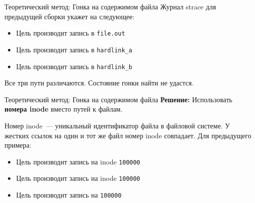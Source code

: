     \begin{frame}{Теоретический метод: Гонка на содержимом файла}
        Журнал strace для предыдущей сборки укажет на следующее:

        \begin{itemize}
            \item Цель  производит запись в \texttt{file.out}
            \item Цель  производит запись в \texttt{hardlink\_a}
            \item Цель  производит запись в \texttt{hardlink\_b}
        \end{itemize}

        Все три пути различаются. Состояние гонки найти не удастся.


    \end{frame}

    \begin{frame}{Теоретический метод: Гонка на содержимом файла}
        \textbf{Решение:} Использовать \textbf{номера inode} вместо путей к файлам.

        Номер inode~--- уникальный идентификатор файла в файловой системе. У жестких ссылок на один и тот же файл номер inode совпадает. Для предыдущего примера:

        \begin{itemize}
            \item Цель  производит запись на inode \texttt{100000}
            \item Цель  производит запись на inode \texttt{100000}
            \item Цель  производит запись на \texttt{100000}
        \end{itemize}

    \end{frame}

